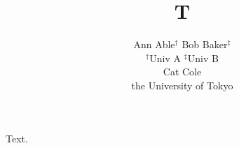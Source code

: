 \documentclass{article}
\title{T}
\author{Ann Able$^{\dagger}$ \quad Bob Baker$^{\ddagger}$ \\ $^\dagger$Univ A \quad $^\ddagger$Univ B \\ Cat Cole \\ the University of Tokyo}
\begin{document}
\maketitle
Text.
\end{document}
